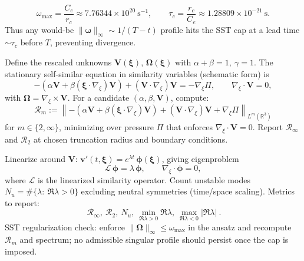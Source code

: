 \documentclass[10pt,reprint,aps,onecolumn,nofootinbib]{revtex4-2}
\begin{document}
    \[
        \omega_{\max}=\frac{C_e}{r_c}\approx 7.76344\times 10^{20}\ \mathrm{s^{-1}},\qquad
        \tau_c=\frac{r_c}{C_e}\approx 1.28809\times 10^{-21}\ \mathrm{s}.
    \]
    Thus any would-be \( \lVert\boldsymbol{\omega}\rVert_\infty\sim 1/(T-t) \) profile hits the SST cap at a lead time \(\sim \tau_c\) before \(T\), preventing divergence.

    Define the rescaled unknowns \(\mathbf{V}(\boldsymbol{\xi})\), \(\boldsymbol{\Omega}(\boldsymbol{\xi})\) with \(\alpha+\beta=1,\ \gamma=1\).
    The stationary self-similar equation in similarity variables (schematic form) is
    \[
        -\left(\alpha \mathbf{V} + \beta (\boldsymbol{\xi}\!\cdot\!\nabla_{\!\xi})\mathbf{V}\right)
        + (\mathbf{V}\!\cdot\!\nabla_{\!\xi})\mathbf{V} = -\nabla_{\!\xi} \Pi,\qquad
        \nabla_{\!\xi}\!\cdot\!\mathbf{V}=0,
    \]
    with \(\boldsymbol{\Omega}=\nabla_{\!\xi}\times\mathbf{V}\).
    For a candidate \((\alpha,\beta,\mathbf{V})\), compute:
    \[
        \mathcal{R}_m := \left\lVert
                             -\left(\alpha \mathbf{V} + \beta (\boldsymbol{\xi}\!\cdot\!\nabla_{\!\xi})\mathbf{V}\right)
                             + (\mathbf{V}\!\cdot\!\nabla_{\!\xi})\mathbf{V} + \nabla_{\!\xi}\Pi
        \right\rVert_{L^m(\mathbb{R}^3)}
    \]
    for \(m\in\{2,\infty\}\), minimizing over pressure \(\Pi\) that enforces \(\nabla_{\!\xi}\!\cdot\!\mathbf{V}=0\).
    Report \(\mathcal{R}_\infty\) and \(\mathcal{R}_2\) at chosen truncation radius and boundary conditions.

    Linearize around \(\mathbf{V}\): \(\mathbf{v}'(t,\boldsymbol{\xi})=e^{\lambda t}\,\boldsymbol{\phi}(\boldsymbol{\xi})\), giving eigenproblem
    \[
        \mathcal{L}\,\boldsymbol{\phi}=\lambda\,\boldsymbol{\phi},\qquad \nabla_{\!\xi}\!\cdot\!\boldsymbol{\phi}=0,
    \]
    where \(\mathcal{L}\) is the linearized similarity operator.
    Count unstable modes \(N_u = \#\{\lambda:\ \Re\lambda>0\}\) excluding neutral symmetries (time/space scaling).
    Metrics to report:
    \[
        \boxed{
            \ \mathcal{R}_\infty,\ \mathcal{R}_2,\ N_u,\ \min_{\Re\lambda>0}\Re\lambda,\ \max_{\Re\lambda<0}|\Re\lambda|
            \ } .
    \]
    SST regularization check: enforce \(\lVert \boldsymbol{\Omega}\rVert_\infty\le \omega_{\max}\) in the ansatz and recompute \(\mathcal{R}_m\) and spectrum; no admissible singular profile should persist once the cap is imposed.
\end{document}
